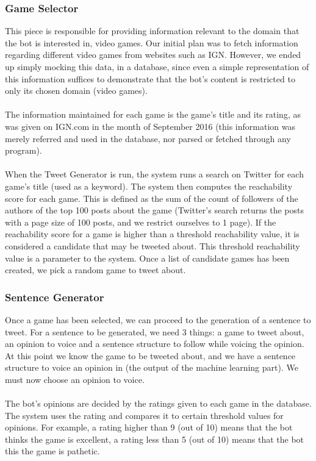 \subsubsection{Game Selector}
This piece is responsible for providing information relevant to the domain that the bot is interested in, video games. Our initial plan was to fetch information regarding different video games from websites such as IGN. However, we ended up simply mocking this data, in a database, since even a simple representation of this information suffices to demonstrate that the bot's content is restricted to only its chosen domain (video games).
\paragraph{}
The information maintained for each game is the game's title and its rating, as was given on IGN.com in the month of September 2016 (this information was merely referred and used in the database, nor parsed or fetched through any program). 
\paragraph{}
When the Tweet Generator is run, the system runs a search on Twitter for each game's title (used as a keyword). The system then computes the reachability score for each game. This is defined as the sum of the count of followers of the authors of the top 100 posts about the game (Twitter's search returns the posts with a page size of 100 posts, and we restrict ourselves to 1 page). If the reachability score for a game is higher than a threshold reachability value, it is considered a candidate that may be tweeted about. This threshold reachability value is a parameter to the system. Once a list of candidate games has been created, we pick a random game to tweet about.
\subsubsection{Sentence Generator}
Once a game has been selected, we can proceed to the generation of a sentence to tweet. For a sentence to be generated, we need 3 things: a game to tweet about, an opinion to voice and a sentence structure to follow while voicing the opinion. At this point we know the game to be tweeted about, and we have a sentence structure to voice an opinion in (the output of the machine learning part). We must now choose an opinion to voice.
\paragraph{}
The bot's opinions are decided by the ratings given to each game in the database. The system uses the rating and compares it to certain threshold values for opinions. For example, a rating higher than 9 (out of 10) means that the bot thinks the game is excellent, a rating less than 5 (out of 10) means that the bot this the game is pathetic.
